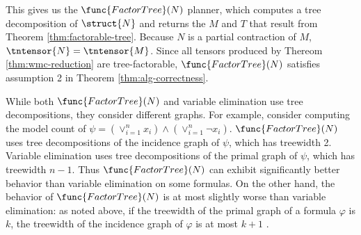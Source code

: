 This gives us the $\func{FactorTree}(N)$ planner, which computes a tree decomposition of $\struct{N}$ and returns the $M$ and $T$ that result from Theorem \ref{thm:factorable-tree}. Because $N$ is a partial contraction of $M$, $\tntensor{N} = \tntensor{M}$. Since all tensors produced by Thereom \ref{thm:wmc-reduction} are tree-factorable, $\func{FactorTree}(N)$ satisfies assumption 2 in Theorem \ref{thm:alg-correctness}. 

While both $\func{FactorTree}(N)$ and variable elimination \cite{BDP09,KDLD05} use tree decompositions, they consider different graphs. For example, consider computing the model count of $\psi = \left(\lor_{i=1}^n x_i\right) \land \left(\lor_{i=1}^n \neg x_i\right)$. $\func{FactorTree}(N)$ uses tree decompositions of the incidence graph of $\psi$, which has treewidth 2. Variable elimination uses tree decompositions of the primal graph of $\psi$, which has treewidth $n-1$. Thus $\func{FactorTree}(N)$ can exhibit significantly better behavior than variable elimination on some formulas. On the other hand, the behavior of $\func{FactorTree}(N)$ is at most slightly worse than variable elimination: as noted above, if the treewidth of the primal graph of a formula $\varphi$ is $k$, the treewidth of the incidence graph of $\varphi$ is at most $k+1$ \cite{KV00}. %